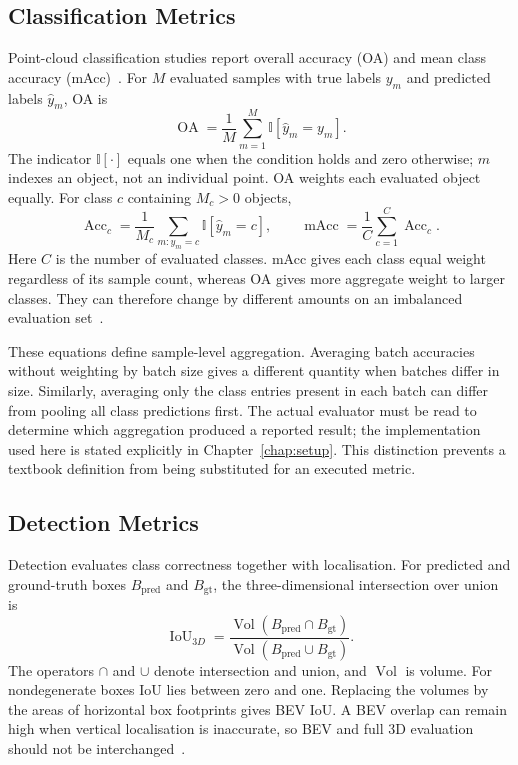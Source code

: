 \subsection{Classification Metrics}
\label{subsec:metrics_classification}

Point-cloud classification studies report overall accuracy (OA) and mean
class accuracy (mAcc)~\cite{qi2017pointnet}. For $M$ evaluated samples
with true labels $y_m$ and predicted labels $\hat y_m$, OA is
\begin{equation}
 \operatorname{OA}=\frac1M\sum_{m=1}^M\mathbb I[\hat y_m=y_m].
 \label{eq:fc-2-12}
\end{equation}
The indicator $\mathbb I[\cdot]$ equals one when the condition holds and
zero otherwise; $m$ indexes an object, not an individual point. OA weights
each evaluated object equally. For class $c$ containing $M_c>0$ objects,
\begin{equation}
 \operatorname{Acc}_c=\frac1{M_c}\sum_{m:y_m=c}\mathbb I[\hat y_m=c],
 \qquad
 \operatorname{mAcc}=\frac1C\sum_{c=1}^C\operatorname{Acc}_c.
 \label{eq:macc}
\end{equation}
Here $C$ is the number of evaluated classes. mAcc gives each class equal
weight regardless of its sample count, whereas OA gives more aggregate
weight to larger classes. They can therefore change by different amounts
on an imbalanced evaluation set~\cite{qi2017pointnet}.

These equations define sample-level aggregation. Averaging batch
accuracies without weighting by batch size gives a different quantity when
batches differ in size. Similarly, averaging only the class entries present
in each batch can differ from pooling all class predictions first. The
actual evaluator must be read to determine which aggregation produced a
reported result; the implementation used here is stated explicitly in
Chapter~\ref{chap:setup}. This distinction prevents a textbook definition
from being substituted for an executed metric.

\subsection{Detection Metrics}
\label{subsec:metrics_detection}

Detection evaluates class correctness together with localisation. For
predicted and ground-truth boxes $B_\mathrm{pred}$ and $B_\mathrm{gt}$, the
three-dimensional intersection over union is
\begin{equation}
 \operatorname{IoU}_{3D}=
 \frac{\operatorname{Vol}(B_\mathrm{pred}\cap B_\mathrm{gt})}
 {\operatorname{Vol}(B_\mathrm{pred}\cup B_\mathrm{gt})}.
 \label{eq:iou3d}
\end{equation}
The operators $\cap$ and $\cup$ denote intersection and union, and
$\operatorname{Vol}$ is volume. For nondegenerate boxes IoU lies between
zero and one. Replacing the volumes by the areas of horizontal box
footprints gives BEV IoU. A BEV overlap can remain high when vertical
localisation is inaccurate, so BEV and full 3D evaluation should not be
interchanged~\cite{shi2019pointrcnn,simonelli2019disentangling}.

